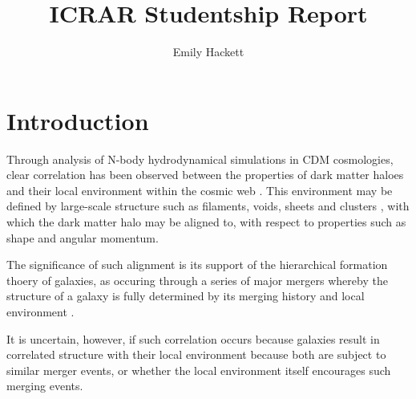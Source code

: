 \documentclass[a4paper,fleqn,usenatbib,useAMS]{mnras}
\title[ICRAR Report]{ICRAR Studentship Report}
\author[E. Hackett]{Emily Hackett}
\begin{document}
\maketitle

\section{Introduction}
Through analysis of N-body hydrodynamical simulations in CDM cosmologies, clear correlation has been observed between the properties of dark matter haloes and their local environment within the cosmic web \cite{lemson99}. This environment may be defined by large-scale structure such as filaments, voids, sheets and clusters \cite{hahn07a} \cite{bailin05}, with which the dark matter halo may be aligned to, with respect to properties such as shape and angular momentum.

The significance of such alignment is its support of the hierarchical formation thoery of galaxies, as occuring through a series of major mergers whereby the structure of a galaxy is fully determined by its merging history and local environment \cite{lemson99}.

It is uncertain, however, if such correlation occurs because galaxies result in correlated structure with their local environment because both are subject to similar merger events, or whether the local environment itself encourages such merging events.



\end{document}
